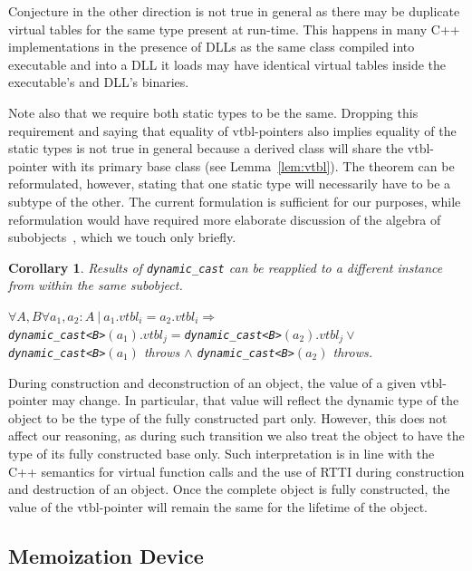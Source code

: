 \documentclass[preprint]{sigplanconf}
\makeatletter
\DeclareRobustCommand{\code}[1]{{\lstinline[breaklines=false,escapechar=@]{#1}}}
\newtheorem{corollary}{Corollary}
\makeatother
\begin{document}
\noindent
Conjecture in the other direction is not true in general as there may be 
duplicate virtual tables for the same type present at run-time. This happens in 
many C++ implementations in the presence of DLLs as the same class compiled into 
executable and into a DLL it loads may have identical virtual tables inside the 
executable's and DLL's binaries.

Note also that we require both static types to be the same. Dropping this 
requirement and saying that equality of vtbl-pointers also implies equality of 
the static types is not true in general because a derived class will share the 
vtbl-pointer with its primary base class (see Lemma~\ref{lem:vtbl}). The theorem 
can be reformulated, however, stating that one static type will necessarily have 
to be a subtype of the other. The current formulation is sufficient for our 
purposes, while reformulation would have required more elaborate discussion of 
the algebra of subobjects~\cite{RDL11}, which we touch only briefly.

\begin{corollary}
Results of \code{dynamic_cast} can be reapplied to a different instance from 
within the same subobject. 

$\forall A,B \forall a_1, a_2 : A\ |\ a_1.vtbl_i = a_2.vtbl_i \Rightarrow$ \\
\code{dynamic_cast<B>}$(a_1).vtbl_j = $\code{dynamic_cast<B>}$(a_2).vtbl_j \vee$ \\
\code{dynamic_cast<B>}$(a_1)$ throws $\wedge$ \code{dynamic_cast<B>}$(a_2)$ throws.
\label{crl:vtbl}
\end{corollary}

\noindent
During construction and deconstruction of 
an object, the value of a given vtbl-pointer may change. In particular, 
that value will reflect the dynamic type of the object to be the type of the 
fully constructed part only. However, this does not affect our reasoning, as during 
such transition we also treat the object to have the type of its fully 
constructed base only. Such interpretation is in line with the C++ semantics for 
virtual function calls and the use of RTTI during construction and destruction of an 
object. Once the complete object is fully constructed, the value of the 
vtbl-pointer will remain the same for the lifetime of the object.

\subsection{Memoization Device}
\label{sec:memdev}
\end{document}
